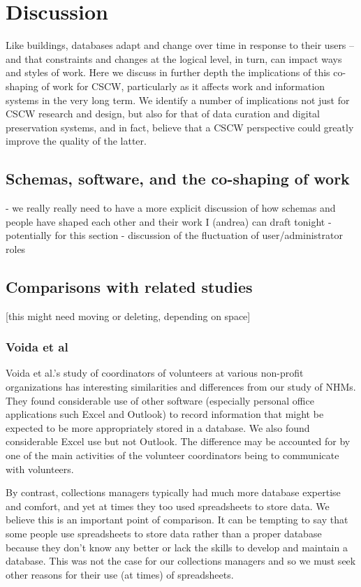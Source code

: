 \section{Discussion}

Like buildings, databases adapt and change over time in response to their users -- and that constraints and changes at the logical level, in turn, can impact ways and styles of work.  Here we discuss in further depth the implications of this co-shaping of work for CSCW, particularly as it affects work and information systems in the very long term.  We identify a number of implications not just for CSCW research and design, but also for that of data curation and digital preservation systems, and in fact, believe that a CSCW perspective could greatly improve the quality of the latter.

\subsection{Schemas, software, and the co-shaping of work}

- we really really need to have a more explicit discussion of how schemas and people have shaped each other and their work I (andrea) can draft tonight
- potentially for this section - discussion of the fluctuation of user/administrator roles

\subsection{Comparisons with related studies}
[this might need moving or deleting, depending on space]
\subsubsection{Voida et al}

Voida et al.'s study of coordinators of volunteers at various non-profit organizations \cite{voida2011homebrew} has interesting similarities and differences from our study of NHMs. They found considerable use of other software (especially personal office applications such Excel and Outlook) to record information that might be expected to be more appropriately stored in a database. We also found considerable Excel use but not Outlook. The difference may be accounted for by one of the main activities of the volunteer coordinators being to communicate with volunteers. 

By contrast, collections managers typically had much more database expertise and comfort, and yet at times they too used spreadsheets to store data. We believe this is an important point of comparison. It can be tempting to say that some people use spreadsheets to store data rather than a proper database because they don't know any better or lack the skills to develop and maintain a database. This was not the case for our collections managers and so we must seek other reasons for their use (at times) of spreadsheets.

